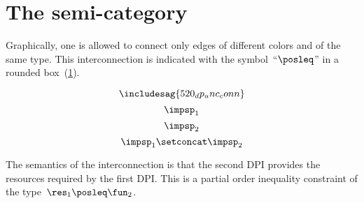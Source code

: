 

\section{The semi-category \DPI}


Graphically, one is allowed to connect only edges of different colors and of the same type. 
This interconnection is indicated with the symbol~``$\posleq$'' in a rounded box~(\cref{fig:connection}).

\begin{figure}[h]
  \centering
  \caption{\label{fig:connection}}
\end{figure}

\begin{equation}
  \label{eq:dp_conn}
  \includesag{520_dp_unc_conn}
\end{equation}
\begin{equation}
  \label{eq:impsp1}
  \impsp_1
\end{equation}
\begin{equation}
  \label{eq:impsp2}
  \impsp_2
\end{equation}
\begin{equation}\label{eq:impsp12}
\impsp_{1} \setconcat \impsp_{2}
\end{equation}

The semantics of the interconnection is that the second DPI provides the resources required by the first DPI. 
This is a partial order inequality constraint of the type~$\res_{1}\posleq\fun_{2}$.


